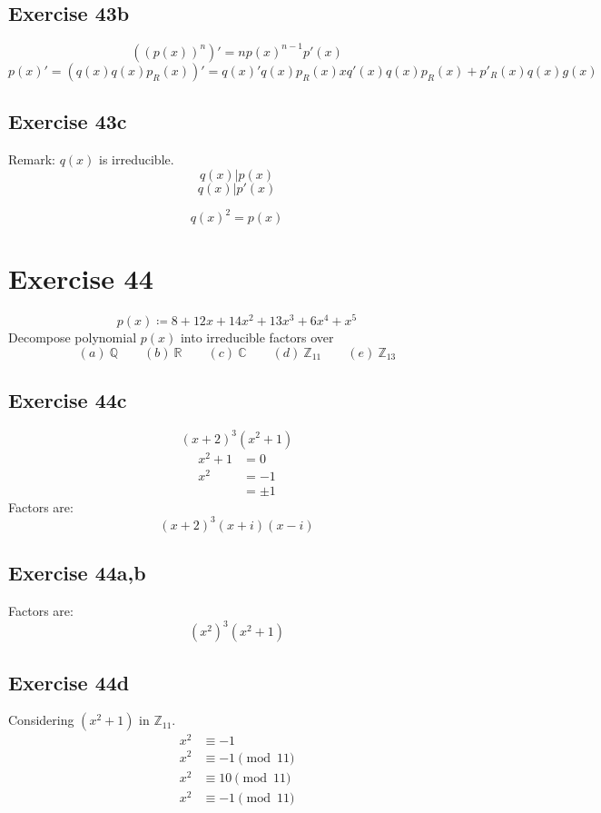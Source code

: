 \documentclass[a4paper]{article}
\theoremstyle{definition}
\begin{document}
\subsection{Exercise 43b}
\[ ((p(x))^n)' = n p(x)^{n-1} p'(x) \]
\[ p(x)' = (q(x) q(x) p_R(x))' = q(x)' q(x) p_R(x) x q'(x) q(x) p_R(x) + p'_R(x) q(x) g(x) \]

\subsection{Exercise 43c}
Remark: $q(x)$ is irreducible.
\[ q(x) | p(x) \]
\[ q(x) | p'(x) \]


\[ q(x)^2 = p(x) \]

\section{Exercise 44}
\begin{ex}
  \[ p(x) \coloneqq 8 + 12x + 14x^2 + 13x^3 + 6x^4 + x^5 \]
  Decompose polynomial $p(x)$ into irreducible factors over
  \[
    (a) \: \mathbb Q \qquad
    (b) \: \mathbb R \qquad
    (c) \: \mathbb C \qquad
    (d) \: \mathbb Z_{11} \qquad
    (e) \: \mathbb Z_{13}
  \]
\end{ex}

\subsection{Exercise 44c}
\[ (x + 2)^3 (x^2+1) \]
\begin{align*}
  x^2 + 1 &= 0 \\
  x^2 &= -1 \\
    &= \pm 1
\end{align*}
Factors are:
\[ (x + 2)^3 (x + i) (x - i) \]

\subsection{Exercise 44a,b}
Factors are:
\[ (x^2)^3 (x^2 + 1) \]

\subsection{Exercise 44d}
Considering $(x^2+1)$ in $\mathbb Z_{11}$.
\begin{align*}
  x^2 &\equiv -1 \\
  x^2 &\equiv -1 \pmod{11} \\
  x^2 &\equiv 10 \pmod{11} \\
  x^2 &\equiv -1 \pmod{11} \\
\end{align*}
\end{document}
